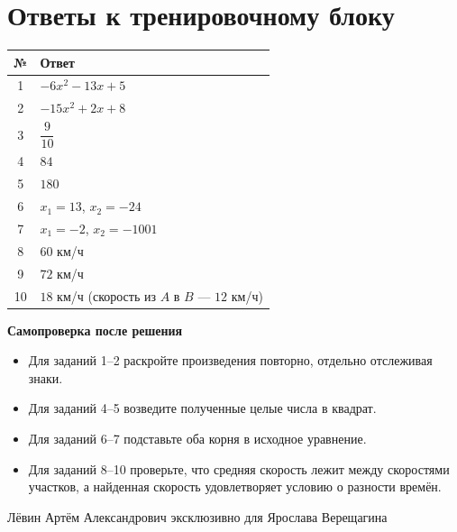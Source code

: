 \documentclass[a4paper,12pt]{article}
\begin{document}
\clearpage
\section*{Ответы к тренировочному блоку}
\vspace{3mm}
\begin{center}
\renewcommand{\arraystretch}{1.55}
\begin{tabularx}{\linewidth}{@{}cX@{}}
\toprule
№ & Ответ\\
\midrule
1 & $-6x^2-13x+5$\\
2 & $-15x^2+2x+8$\\
3 & $\dfrac9{10}$\\
4 & $84$\\
5 & $180$\\
6 & $x_1=13$, $x_2=-24$\\
7 & $x_1=-2$, $x_2=-1001$\\
8 & $60$ км/ч\\
9 & $72$ км/ч\\
10 & $18$ км/ч (скорость из $A$ в $B$ --- $12$ км/ч)\\
\bottomrule
\end{tabularx}
\end{center}

\vspace{16mm}
\textcolor{darkaccent}{\textbf{Самопроверка после решения}}
\begin{itemize}[leftmargin=1.7em,itemsep=5pt]
\item Для заданий 1--2 раскройте произведения повторно, отдельно отслеживая знаки.
\item Для заданий 4--5 возведите полученные целые числа в квадрат.
\item Для заданий 6--7 подставьте оба корня в исходное уравнение.
\item Для заданий 8--10 проверьте, что средняя скорость лежит между скоростями участков, а найденная скорость удовлетворяет условию о разности времён.
\end{itemize}

\vfill
\begin{center}
{\footnotesize\color{softgray}Лёвин Артём Александрович эксклюзивно для Ярослава Верещагина}
\end{center}
\end{document}
